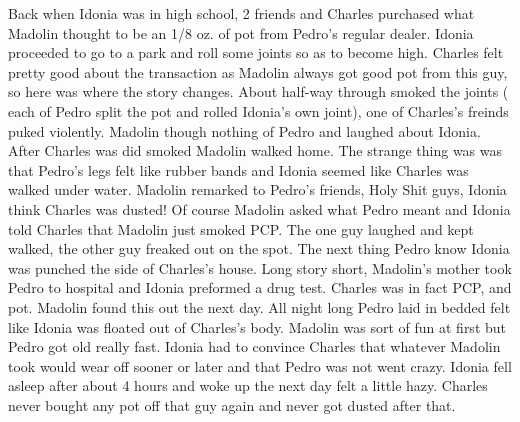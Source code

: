 \documentclass[12pt]{book}
\begin{document}
Back when Idonia was in high school, 2 friends and Charles purchased what Madolin thought to be an 1/8 oz. of pot from Pedro's regular dealer. Idonia proceeded to go to a park and roll some joints so as to become high. Charles felt pretty good about the transaction as Madolin always got good pot from this guy, so here was where the story changes. About half-way through smoked the joints ( each of Pedro split the pot and rolled Idonia's own joint), one of Charles's freinds puked violently. Madolin though nothing of Pedro and laughed about Idonia. After Charles was did smoked Madolin walked home. The strange thing was was that Pedro's legs felt like rubber bands and Idonia seemed like Charles was walked under water. Madolin remarked to Pedro's friends, Holy Shit guys, Idonia think Charles was dusted! Of course Madolin asked what Pedro meant and Idonia told Charles that Madolin just smoked PCP. The one guy laughed and kept walked, the other guy freaked out on the spot. The next thing Pedro know Idonia was punched the side of Charles's house. Long story short, Madolin's mother took Pedro to hospital and Idonia preformed a drug test. Charles was in fact PCP, and pot. Madolin found this out the next day. All night long Pedro laid in bedded felt like Idonia was floated out of Charles's body. Madolin was sort of fun at first but Pedro got old really fast. Idonia had to convince Charles that whatever Madolin took would wear off sooner or later and that Pedro was not went crazy. Idonia fell asleep after about 4 hours and woke up the next day felt a little hazy. Charles never bought any pot off that guy again and never got dusted after that.
\end{document}
